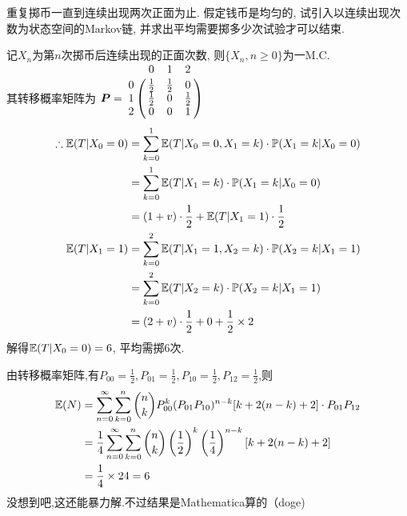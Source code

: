\begin{problem}{3.5}
重复掷币一直到连续出现两次正面为止. 假定钱币是均匀的, 试引入以连续出现次数为状态空间的Markov链, 并求出平均需要掷多少次试验才可以结束.
\end{problem}
\begin{solution}[1]
	记$X_n$为第$n$次掷币后连续出现的正面次数, 则$\{X_n, n \geqslant 0 \}$为一M.C.\\
	其转移概率矩阵为
	$\bm{P} = \bordermatrix{
			~ & 0 & 1 & 2 \cr
			0 & \frac{1}{2} & \frac{1}{2} & 0 \cr
			1 & \frac{1}{2} & 0 & \frac{1}{2} \cr
			2 & 0 & 0 & 1}$
	\[\begin{split}
			\therefore \mathbb{E}(T | X_0 = 0) & = \sum^1_{k=0}\mathbb{E}(T|X_0 = 0, X_1 = k)\cdot \mathbb{P}(X_1 = k | X_0 = 0)\\
			& = \sum^1_{k=0}\mathbb{E}(T|X_1 = k)\cdot \mathbb{P}(X_1 = k | X_0 = 0)\\
			& = (1+v)\cdot \frac{1}{2} + \mathbb{E}(T| X_1 = 1) \cdot \frac{1}{2}\\
			\quad \mathbb{E}(T | X_1 = 1) & = \sum^2_{k=0}\mathbb{E}(T|X_1 = 1, X_2 = k)\cdot \mathbb{P}(X_2 = k | X_1 = 1)\\
			& = \sum^2_{k=0}\mathbb{E}(T|X_2 = k)\cdot \mathbb{P}(X_2 = k | X_1 = 1)\\
			& = (2+v)\cdot \frac{1}{2} + 0 + \frac{1}{2} \times 2
		\end{split}\]
	解得$\mathbb{E}(T | X_0 = 0) = 6$, 平均需掷$6$次.
\end{solution}
\begin{solution}[2]
	由转移概率矩阵,有$P_{00}=\frac{1}{2}, P_{01}=\frac{1}{2},P_{10}=\frac{1}{2},P_{12}=\frac{1}{2}$,则
	\[\begin{aligned}
			\mathbb{E}(N) & = \sum_{n=0}^{\infty}\sum_{k=0}^{n}\binom{n}{k}P_{00}^k (P_{01}P_{10})^{n-k}[k+2(n-k)+2]\cdot P_{01}P_{12}                      \\
			      & = \frac{1}{4}\sum_{n=0}^{\infty}\sum_{k=0}^{n}\binom{n}{k}\left(\frac{1}{2}\right)^k \left(\frac{1}{4}\right)^{n-k}[k+2(n-k)+2] \\
			      & = \frac{1}{4}\times 24 = 6
		\end{aligned}\]
	没想到吧,这还能暴力解.不过结果是Mathematica算的（doge)
\end{solution}

